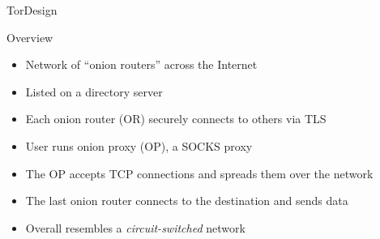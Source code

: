 \documentclass[12pt]{beamer}
\begin{document}
\begin{frame}{Tor}{Design}
	\begin{block}{Overview}
		\begin{itemize}
			\item Network of ``onion routers'' across the Internet
			\item Listed on a directory server
			\item Each onion router (OR) securely connects to others via TLS
			\item User runs onion proxy (OP), a SOCKS proxy
			\item The OP accepts TCP connections and spreads them over the
				network
			\item The last onion router connects to the destination and sends
				data
			\item Overall resembles a \textit{circuit-switched} network
		\end{itemize}
	\end{block}
\end{frame}
\end{document}
